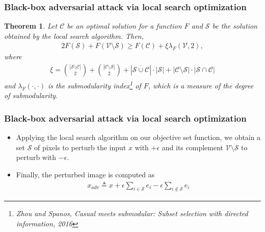 \documentclass[10pt,mathserif]{beamer}
\newtheorem{thm}{Theorem}
\begin{document}
\begin{frame}
\frametitle{Black-box adversarial attack via local search optimization}
\setcounter{thm}{0}
\begin{thm}
Let $\mathcal{C}$ be an optimal solution for a function $F$ and $\mathcal{S}$ be the solution obtained by the local search algorithm. Then,
\begin{align*}
    2F(\mathcal{S})+F(\mathcal{V} \setminus \mathcal{S}) \ge  F(\mathcal{C}) + \xi \lambda_F(\mathcal{V}, 2),
\end{align*}
where 
\small
\begin{align*}
    \xi = \binom{|\mathcal{S} \setminus \mathcal{C}|}{2} + \binom{|\mathcal{C} \setminus \mathcal{S}|}{2} + |\overline{\mathcal{S} \cup \mathcal{C}}| \cdot |\mathcal{S}| + |\mathcal{C} \setminus \mathcal{S}| \cdot |\mathcal{S} \cap \mathcal{C}|
\end{align*}
\normalsize
and $\lambda_{F}(\cdot,\cdot)$ is the submodularity index\footnote{\scriptsize Zhou and Spanos, \textit{Casual meets submodular: Subset selection with directed information, 2016}} of $F$, which is a measure of the degree of submodularity.
\end{thm}
\end{frame}

\begin{frame}
\frametitle{Black-box adversarial attack via local search optimization}
\begin{itemize}\itemsep=12pt
\item Applying the local search algorithm on our objective set function, we obtain a set $\mathcal{S}$ of pixels to perturb the input $x$ with $+\epsilon$ and its complement $\mathcal{V} \setminus \mathcal{S}$ to perturb with $-\epsilon$.\pause
\item Finally, the perturbed image is computed as
\begin{align*}
x_{adv} \triangleq x + \epsilon \sum_{i \in \mathcal{S}}e_i - \epsilon \sum_{i \notin \mathcal{S}}e_i
\end{align*}
\end{itemize}
\end{frame}
\end{document}

